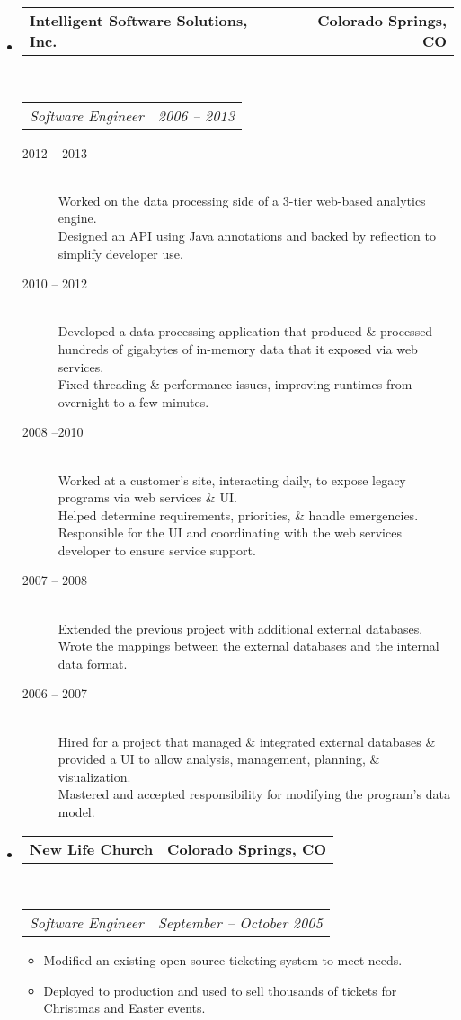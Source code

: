 \documentclass[10pt,letterpaper]{article}
\makeatletter
\newcommand{\headerrow}[2]
{\begin{tabular*}{\linewidth}{l@{\extracolsep{\fill}}r}
	#1 &
	#2 \\
\end{tabular*}}
\makeatother
\begin{document}
\begin{itemize}
	\item
	\headerrow
		{\textbf{Intelligent Software Solutions, Inc.}}
		{\textbf{Colorado Springs, CO}}
	\\
	\headerrow
		{\emph{Software Engineer}}
		{\emph{2006 -- 2013}}
	\begin{description}
		\item[2012 -- 2013] \hfill \\
				Worked on the data processing side of a 3-tier web-based analytics engine. \\
				Designed an API using Java annotations and backed by reflection to simplify developer use.
		\item[2010 -- 2012] \hfill \\
				Developed a data processing application that produced \& processed hundreds of gigabytes of in-memory data that it exposed via web services. \\
				Fixed threading \& performance issues, improving runtimes from overnight to a few minutes.
		\item[2008 --2010] \hfill \\
				Worked at a customer’s site, interacting daily, to expose legacy programs via web services \& UI. \\
				Helped determine requirements, priorities, \& handle emergencies. \\
				Responsible for the UI and coordinating with the web services developer to ensure service support.
		\item[2007 -- 2008] \hfill \\
				Extended the previous project with additional external databases. \\
				Wrote the mappings between the external databases and the internal data format.
		\item[2006 -- 2007] \hfill \\
				Hired for a project that managed \& integrated external databases \& provided a UI to allow analysis, management, planning, \& visualization. \\
				Mastered and accepted responsibility for modifying the program’s data model.
	\end{description}

	\item
	\headerrow
		{\textbf{New Life Church}}
		{\textbf{Colorado Springs, CO}}
	\\
	\headerrow
		{\emph{Software Engineer}}
		{\emph{September -- October 2005}}
	\begin{itemize}
		\item Modified an existing open source ticketing system to meet needs.
		\item Deployed to production and used to sell thousands of tickets for Christmas and Easter events.
	\end{itemize}

\end{itemize}
\end{document}

